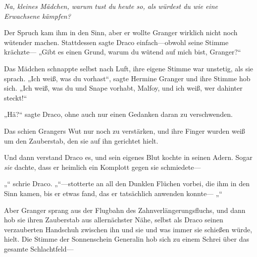 \emph{Na, kleines Mädchen, warum tust du heute so, als würdest du wie eine Erwachsene kämpfen?}

Der Spruch kam ihm in den Sinn, aber er wollte Granger wirklich nicht noch wütender machen. Stattdessen sagte Draco einfach—obwohl seine Stimme krächzte— „Gibt es einen Grund, warum du wütend auf mich bist, Granger?“

Das Mädchen schnappte selbst nach Luft, ihre eigene Stimme war unstetig, als sie sprach. „Ich weiß, was du vorhast“, sagte Hermine Granger und ihre Stimme hob sich. „Ich weiß, was du und Snape vorhabt, Malfoy, und ich weiß, wer dahinter steckt!“

„Hä?“ sagte Draco, ohne auch nur einen Gedanken daran zu verschwenden.

Das schien Grangers Wut nur noch zu verstärken, und ihre Finger wurden weiß um den Zauberstab, den sie auf ihn gerichtet hielt.

Und dann verstand Draco es, und sein eigenes Blut kochte in seinen Adern. Sogar \emph{sie} dachte, dass er heimlich ein Komplott gegen sie schmiedete—

„“ schrie Draco. „“—stotterte an all den Dunklen Flüchen vorbei, die ihm in den Sinn kamen, bis er etwas fand, das er tatsächlich anwenden konnte— „“

Aber Granger sprang aus der Flugbahn des Zahnverlängerungsfluchs, und dann hob sie ihren Zauberstab aus allernächster Nähe, selbst als Draco seinen verzauberten Handschuh zwischen ihn und sie und was immer sie schießen würde, hielt. Die Stimme der Sonnenschein Generalin hob sich zu einem Schrei über das gesamte Schlachtfeld—

